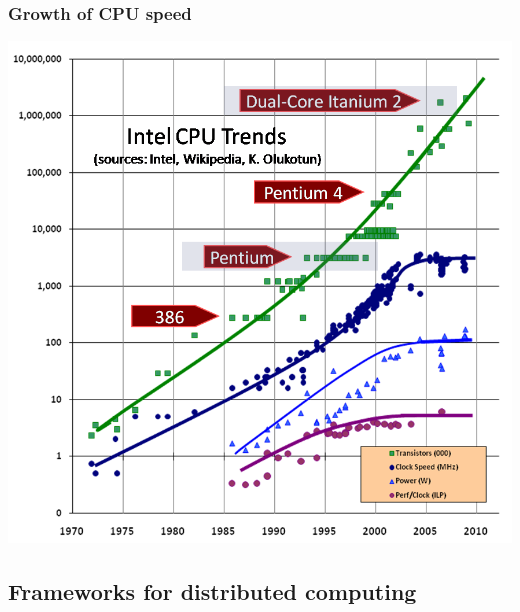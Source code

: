 \begin{frame}
 \frametitle{Growth of CPU speed}
\begin{center}
	 \includegraphics[keepaspectratio=true,scale=0.5]{figs/12/cpu.png}
\end{center}

\end{frame}

\subsection{Frameworks for distributed computing}

